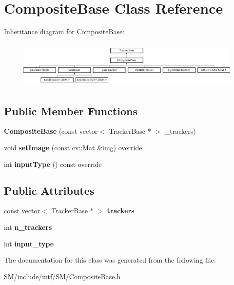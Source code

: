\hypertarget{classCompositeBase}{\section{Composite\-Base Class Reference}
\label{classCompositeBase}
}
Inheritance diagram for Composite\-Base\-:\begin{figure}[H]
\begin{center}
\leavevmode
\includegraphics[height=2.377919cm]{classCompositeBase}
\end{center}
\end{figure}
\subsection*{Public Member Functions}
\begin{DoxyCompactItemize}
\item 
\hypertarget{classCompositeBase_acaaa345d5ce1c18626a5e2d2676b04bc}{{\bfseries Composite\-Base} (const vector$<$ Tracker\-Base $\ast$ $>$ \-\_\-trackers)}\label{classCompositeBase_acaaa345d5ce1c18626a5e2d2676b04bc}

\item 
\hypertarget{classCompositeBase_a9321ba237831d42c056e155cdd061a92}{void {\bfseries set\-Image} (const cv\-::\-Mat \&img) override}\label{classCompositeBase_a9321ba237831d42c056e155cdd061a92}

\item 
\hypertarget{classCompositeBase_a0466b28c23eaf6d24fca18b64f5b7460}{int {\bfseries input\-Type} () const override}\label{classCompositeBase_a0466b28c23eaf6d24fca18b64f5b7460}

\end{DoxyCompactItemize}
\subsection*{Public Attributes}
\begin{DoxyCompactItemize}
\item 
\hypertarget{classCompositeBase_a8b9f28da78a31e72a5adb8d1289b205f}{const vector$<$ Tracker\-Base $\ast$ $>$ {\bfseries trackers}}\label{classCompositeBase_a8b9f28da78a31e72a5adb8d1289b205f}

\item 
\hypertarget{classCompositeBase_a45580b3f6b80aeb5720f7ced35820da4}{int {\bfseries n\-\_\-trackers}}\label{classCompositeBase_a45580b3f6b80aeb5720f7ced35820da4}

\item 
\hypertarget{classCompositeBase_a65d083e13baa9997fc7b11cbd65d44b9}{int {\bfseries input\-\_\-type}}\label{classCompositeBase_a65d083e13baa9997fc7b11cbd65d44b9}

\end{DoxyCompactItemize}


The documentation for this class was generated from the following file\-:\begin{DoxyCompactItemize}
\item 
S\-M/include/mtf/\-S\-M/Composite\-Base.\-h\end{DoxyCompactItemize}
